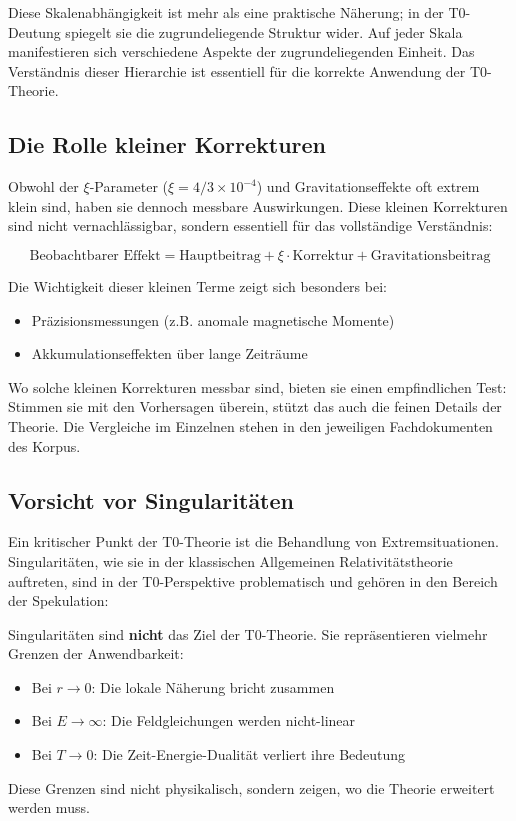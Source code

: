 	Diese Skalenabhängigkeit ist mehr als eine praktische Näherung; in der T0-Deutung spiegelt sie die zugrundeliegende Struktur wider. Auf jeder Skala manifestieren sich verschiedene Aspekte der zugrundeliegenden Einheit. Das Verständnis dieser Hierarchie ist essentiell für die korrekte Anwendung der T0-Theorie.
	
	\subsection{Die Rolle kleiner Korrekturen}
	
	Obwohl der $\xi$-Parameter ($\xi = 4/3 \times 10^{-4}$) und Gravitationseffekte oft extrem klein sind, haben sie dennoch messbare Auswirkungen. Diese kleinen Korrekturen sind nicht vernachlässigbar, sondern essentiell für das vollständige Verständnis:
	
	\begin{equation}
		\text{Beobachtbarer Effekt} = \text{Hauptbeitrag} + \xi \cdot \text{Korrektur} + \text{Gravitationsbeitrag}
	\end{equation}
	
	Die Wichtigkeit dieser kleinen Terme zeigt sich besonders bei:
	\begin{itemize}
		\item Präzisionsmessungen (z.B. anomale magnetische Momente)
		\item Akkumulationseffekten über lange Zeiträume
	\end{itemize}
	
	Wo solche kleinen Korrekturen messbar sind, bieten sie einen empfindlichen Test: Stimmen sie mit den Vorhersagen überein, stützt das auch die feinen Details der Theorie. Die Vergleiche im Einzelnen stehen in den jeweiligen Fachdokumenten des Korpus.
	
	\subsection{Vorsicht vor Singularitäten}
	
	Ein kritischer Punkt der T0-Theorie ist die Behandlung von Extremsituationen. Singularitäten, wie sie in der klassischen Allgemeinen Relativitätstheorie auftreten, sind in der T0-Perspektive problematisch und gehören in den Bereich der Spekulation:
	
	\begin{tcolorbox}[colback=t0yellow!10!white, colframe=t0yellow!75!black, title=Wichtige Einsicht]
		Singularitäten sind \textbf{nicht} das Ziel der T0-Theorie. Sie repräsentieren vielmehr Grenzen der Anwendbarkeit:
		\begin{itemize}
			\item Bei $r \to 0$: Die lokale Näherung bricht zusammen
			\item Bei $E \to \infty$: Die Feldgleichungen werden nicht-linear
			\item Bei $T \to 0$: Die Zeit-Energie-Dualität verliert ihre Bedeutung
		\end{itemize}
		Diese Grenzen sind nicht physikalisch, sondern zeigen, wo die Theorie erweitert werden muss.
	\end{tcolorbox}
	
